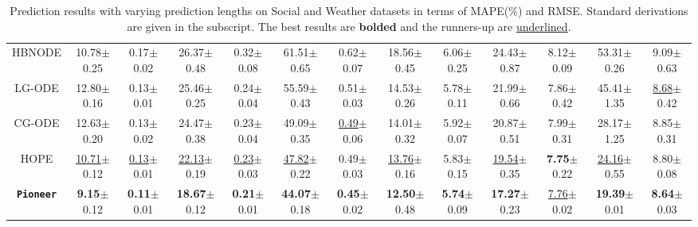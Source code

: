 \begin{table*}[t]
{\begin{tabular}{c|cc|cc|cc|cc|cc|cc}
HBNODE  
& 10.78\scriptsize{$\pm$0.25} & 0.17\scriptsize{$\pm$0.02} & 26.37\scriptsize{$\pm$0.48} & 0.32\scriptsize{$\pm$0.08} & 61.51\scriptsize{$\pm$0.65} & 0.62\scriptsize{$\pm$0.07} & 18.56\scriptsize{$\pm$0.45} & 6.06\scriptsize{$\pm$0.25} & 24.43\scriptsize{$\pm$0.87} & 8.12\scriptsize{$\pm$0.09} & 53.31\scriptsize{$\pm$0.26} & 9.09\scriptsize{$\pm$0.63} \\
LG-ODE  
& 12.80\scriptsize{$\pm$0.16} & 0.13\scriptsize{$\pm$0.01} & 25.46\scriptsize{$\pm$0.25} & 0.24\scriptsize{$\pm$0.04} & 55.59\scriptsize{$\pm$0.43} & 0.51\scriptsize{$\pm$0.03} & 14.53\scriptsize{$\pm$0.26} & 5.78\scriptsize{$\pm$0.11} & 21.99\scriptsize{$\pm$0.66} & 7.86\scriptsize{$\pm$0.42} & 45.41\scriptsize{$\pm$1.35} & \underline{8.68}\scriptsize{$\pm$0.42} \\
CG-ODE  
& 12.63\scriptsize{$\pm$0.20} & 0.13\scriptsize{$\pm$0.02} & 24.47\scriptsize{$\pm$0.38} & 0.23\scriptsize{$\pm$0.04} & 49.09\scriptsize{$\pm$0.35} & \underline{0.49}\scriptsize{$\pm$0.06} & 14.01\scriptsize{$\pm$0.32} & 5.92\scriptsize{$\pm$0.07} & 20.87\scriptsize{$\pm$0.51} & 7.99\scriptsize{$\pm$0.31} & 28.17\scriptsize{$\pm$1.25} & 8.85\scriptsize{$\pm$0.31} \\
HOPE    
& \underline{10.71}\scriptsize{$\pm$0.12} & \underline{0.13}\scriptsize{$\pm$0.01} & \underline{22.13}\scriptsize{$\pm$0.19} & \underline{0.23}\scriptsize{$\pm$0.03} & \underline{47.82}\scriptsize{$\pm$0.22} & 0.49\scriptsize{$\pm$0.03} & \underline{13.76}\scriptsize{$\pm$0.16} & 5.83\scriptsize{$\pm$0.15} & \underline{19.54}\scriptsize{$\pm$0.35} & \textbf{7.75}\scriptsize{$\pm$0.22} & \underline{24.16}\scriptsize{$\pm$0.55} & 8.80\scriptsize{$\pm$0.08} \\
\hline
 \textbf{\texttt{Pioneer}}
& \textbf{9.15}\scriptsize{$\pm$0.12} & \textbf{0.11}\scriptsize{$\pm$0.01} & \textbf{18.67}\scriptsize{$\pm$0.12} & \textbf{0.21}\scriptsize{$\pm$0.01} & \textbf{44.07}\scriptsize{$\pm$0.18} & \textbf{0.45}\scriptsize{$\pm$0.02} & \textbf{12.50}\scriptsize{$\pm$0.48} & \textbf{5.74}\scriptsize{$\pm$0.09} & \textbf{17.27}\scriptsize{$\pm$0.23} & \underline{7.76}\scriptsize{$\pm$0.02} & \textbf{19.39}\scriptsize{$\pm$0.01} & \textbf{8.64}\scriptsize{$\pm$0.03} \\
\hline
\end{tabular}}
\caption{Prediction results with varying prediction lengths on Social and Weather datasets in terms of MAPE(\%) and RMSE. Standard derivations are given in the subscript. The best results are \textbf{bolded} and the runners-up are \underline{underlined}.}
\label{Tab-SocialWeather}
\end{table*}


